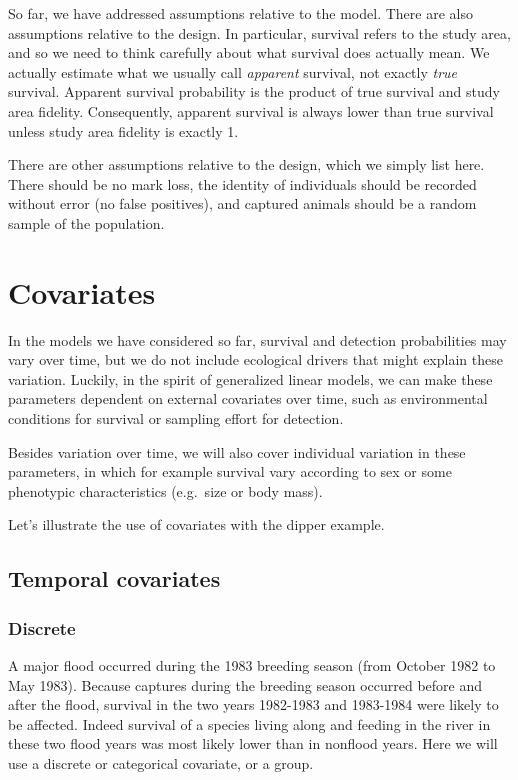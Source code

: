 \documentclass[
  12pt,
]{krantz}
\begin{document}
So far, we have addressed assumptions relative to the model. There are also assumptions relative to the design. In particular, survival refers to the study area, and so we need to think carefully about what survival does actually mean. We actually estimate what we usually call \emph{apparent} survival, not exactly \emph{true} survival. Apparent survival probability is the product of true survival and study area fidelity. Consequently, apparent survival is always lower than true survival unless study area fidelity is exactly 1.

There are other assumptions relative to the design, which we simply list here. There should be no mark loss, the identity of individuals should be recorded without error (no false positives), and captured animals should be a random sample of the population.

\section{Covariates}\label{covariates}

In the models we have considered so far, survival and detection probabilities may vary over time, but we do not include ecological drivers that might explain these variation. Luckily, in the spirit of generalized linear models, we can make these parameters dependent on external covariates over time, such as environmental conditions for survival or sampling effort for detection.

Besides variation over time, we will also cover individual variation in these parameters, in which for example survival vary according to sex or some phenotypic characteristics (e.g.~size or body mass).

Let's illustrate the use of covariates with the dipper example.

\subsection{Temporal covariates}\label{temporal-covariates}

\subsubsection{Discrete}\label{discrete}

A major flood occurred during the 1983 breeding season (from October 1982 to May 1983). Because captures during the breeding season occurred before and after the flood, survival in the two years 1982-1983 and 1983-1984 were likely to be affected. Indeed survival of a species living along and feeding in the river in these two flood years was most likely lower than in nonflood years. Here we will use a discrete or categorical covariate, or a group.
\end{document}
